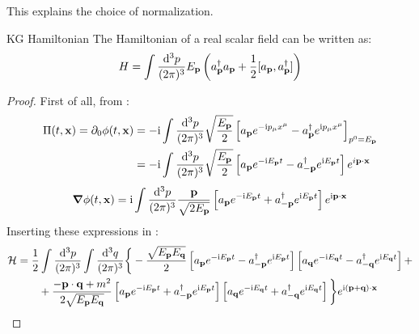 This explains the choice of normalization.

\begin{proposition}{KG Hamiltonian}{}
  The Hamiltonian of a real scalar field can be written as:
  \begin{equation}
    H = \int \frac{\mathrm{d}^3 p}{(2\pi)^3} E_{\mathbf{p}} \left( a_{\mathbf{p}}^\dagger a_{\mathbf{p}} + \frac{1}{2} [a_{\mathbf{p}} , a_{\mathbf{p}}^\dagger] \right)
    \label{eq:kg-haml}
  \end{equation}
\end{proposition}

\begin{proofbox}
  \begin{proof}
    First of all, from :
    \begin{equation*}
      \begin{split}
        \Pi(t,\mathbf{x}) = \partial_0 \phi(t,\mathbf{x})
        &= -\mathrm{i} \int \frac{\mathrm{d}^3 p}{(2\pi)^3} \sqrt{\frac{E_{\mathbf{p}}}{2}} \left[ a_{\mathbf{p}} e^{-\mathrm{i} p_\mu x^\mu} - a_{\mathbf{p}}^\dagger e^{\mathrm{i} p_\mu x^\mu} \right]_{p^0 = E_{\mathbf{p}}} \\
        &= -\mathrm{i} \int \frac{\mathrm{d}^3 p}{(2\pi)^3} \sqrt{\frac{E_{\mathbf{p}}}{2}} \left[ a_{\mathbf{p}} e^{-\mathrm{i} E_{\mathbf{p}} t} - a_{-\mathbf{p}}^\dagger e^{\mathrm{i} E_{\mathbf{p}} t} \right] e^{i \mathbf{p} \cdot \mathbf{x}}
      \end{split}
    \end{equation*}
    \begin{equation*}
      \boldsymbol{\nabla} \phi(t,\mathbf{x}) = \mathrm{i} \int \frac{\mathrm{d}^3 p}{(2\pi)^3} \frac{\mathbf{p}}{\sqrt{2E_{\mathbf{p}}}} \left[ a_{\mathbf{p}} e^{-\mathrm{i} E_{\mathbf{p}} t} + a_{-\mathbf{p}}^\dagger e^{\mathrm{i} E_{\mathbf{p}} t} \right] e^{\mathrm{i} \mathbf{p} \cdot \mathbf{x}}
    \end{equation*}
    Inserting these expressions in :
    \begin{equation*}
      \begin{split}
        \ham
        &= \frac{1}{2} \int \frac{\dd^3 p}{(2\pi)^3} \int \frac{\dd^3 q}{(2\pi)^3} \bigg\{ - \frac{\sqrt{E_\ve{p} E_\ve{q}}}{2} \left[ a_\ve{p} e^{-\img E_\ve{p} t} - a_{-\ve{p}}^\dagger e^{\img E_\ve{p} t} \right] \left[ a_\ve{q} e^{-\img E_\ve{q} t} - a_{-\ve{q}}^\dagger e^{\img E_{\ve{q}} t} \right] + \\
        & \qquad + \frac{- \ve{p} \cdot \ve{q} + m^2}{2\sqrt{E_\ve{p} E_\ve{q}}} \left[ a_\ve{p} e^{-\img E_\ve{p} t} + a_{-\ve{p}}^\dagger e^{\img E_\ve{p} t} \right] \left[ a_\ve{q} e^{-\img E_\ve{q} t} + a_{-\ve{q}}^\dagger e^{\img E_\ve{q} t} \right] \bigg\} e^{\img (\ve{p} + \ve{q}) \cdot \ve{x}}

\end{split}
\end{equation*}
\end{proof}
\end{proofbox}
